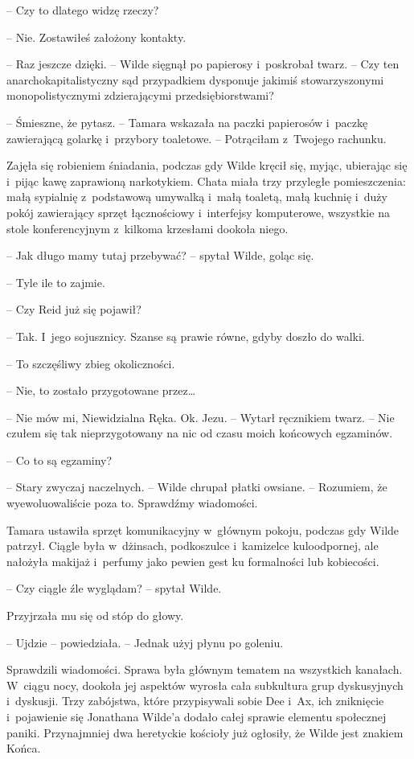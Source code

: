 \documentclass[oneside,polish,11pt,sfheadings]{mwbk}
\begin{document}
-- Czy to dlatego widzę rzeczy?

-- Nie. Zostawiłeś założony kontakty.

-- Raz jeszcze dzięki. -- Wilde sięgnął po papierosy i~poskrobał twarz. -- Czy ten anarchokapitalistyczny sąd przypadkiem dysponuje jakimiś
stowarzyszonymi monopolistycznymi zdzierającymi przedsiębiorstwami?

-- Śmieszne, że pytasz. -- Tamara wskazała na paczki papierosów i~paczkę
zawierającą golarkę i~przybory toaletowe. -- Potrąciłam z~Twojego
rachunku.

Zajęła się robieniem śniadania, podczas gdy Wilde kręcił się, myjąc,
ubierając się i~pijąc kawę zaprawioną narkotykiem. Chata miała trzy
przyległe pomieszczenia: małą sypialnię z~podstawową umywalką i~małą
toaletą, małą kuchnię i~duży pokój zawierający sprzęt łącznościowy i~interfejsy komputerowe, wszystkie na stole konferencyjnym z~kilkoma
krzesłami dookoła niego.

-- Jak długo mamy tutaj przebywać? -- spytał Wilde, goląc się.

-- Tyle ile to zajmie.

-- Czy Reid już się pojawił?

-- Tak. I~jego sojusznicy. Szanse są prawie równe, gdyby doszło do walki.

-- To szczęśliwy zbieg okoliczności.

-- Nie, to zostało przygotowane przez\ldots

-- Nie mów mi, Niewidzialna Ręka. Ok. Jezu. -- Wytarł ręcznikiem twarz. -- Nie czułem się tak nieprzygotowany na nic od czasu moich końcowych
egzaminów.

-- Co to są egzaminy?

-- Stary zwyczaj naczelnych. -- Wilde chrupał płatki owsiane. -- Rozumiem,
że wyewoluowaliście poza to. Sprawdźmy wiadomości.

Tamara ustawiła sprzęt komunikacyjny w~głównym pokoju, podczas gdy Wilde
patrzył. Ciągle była w~dżinsach, podkoszulce i~kamizelce kuloodpornej,
ale nałożyła makijaż i~perfumy jako pewien gest ku formalności lub
kobiecości.

-- Czy ciągle źle wyglądam? -- spytał Wilde.

Przyjrzała mu się od stóp do głowy. 

-- Ujdzie -- powiedziała. -- Jednak
użyj płynu po goleniu.

Sprawdzili wiadomości. Sprawa była głównym tematem na wszystkich
kanałach. W~ciągu nocy, dookoła jej aspektów wyrosła cała subkultura
grup dyskusyjnych i~dyskusji. Trzy zabójstwa, które przypisywali sobie
Dee i~Ax, ich zniknięcie i~pojawienie się Jonathana Wilde'a dodało całej
sprawie elementu społecznej paniki. Przynajmniej dwa heretyckie kościoły
już ogłosiły, że Wilde jest znakiem Końca.
\end{document}
